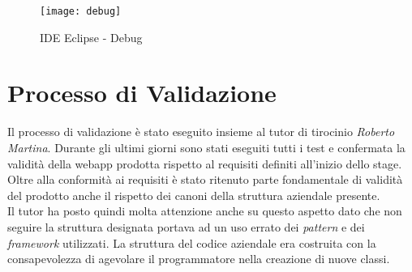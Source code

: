 \begin{figure}[H]
\bigskip
    \centering 
    \texttt{[image: debug]} 
    \bigskip
    \caption{IDE Eclipse - Debug}
\end{figure}
\bigskip
\bigskip
\section{Processo di Validazione}
Il processo di validazione è stato eseguito insieme al tutor di tirocinio \textit{Roberto Martina}. Durante gli ultimi giorni sono stati eseguiti tutti i test e confermata la validità della webapp prodotta rispetto al requisiti definiti all'inizio dello stage. \\
Oltre alla conformità ai requisiti è stato ritenuto parte fondamentale di validità del prodotto anche il rispetto dei canoni della struttura aziendale presente. \\
Il tutor ha posto quindi molta attenzione anche su questo aspetto dato che non seguire la struttura designata portava ad un uso errato dei \textit{pattern} e dei \textit{framework} utilizzati. La struttura del codice aziendale era costruita con la consapevolezza di agevolare il programmatore nella creazione di nuove classi.
